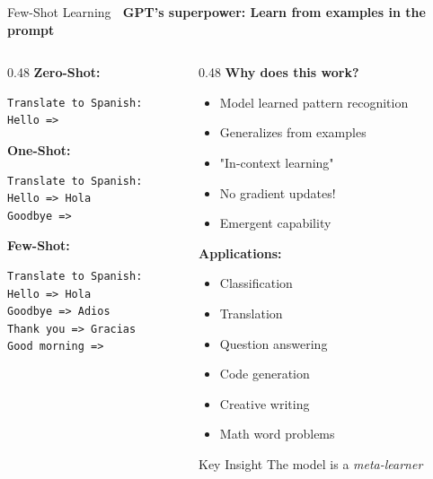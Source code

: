 \documentclass[aspectratio=169]{beamer}
\begin{document}
\begin{frame}{Few-Shot Learning 🎯}
\textbf{GPT's superpower: Learn from examples in the prompt}

\vspace{0.5em}

\begin{columns}[T]
\begin{column}{0.48\textwidth}
\textbf{Zero-Shot:}
\begin{lstlisting}[basicstyle=\ttfamily\tiny]
Translate to Spanish:
Hello =>
\end{lstlisting}

\vspace{0.3em}

\textbf{One-Shot:}
\begin{lstlisting}[basicstyle=\ttfamily\tiny]
Translate to Spanish:
Hello => Hola
Goodbye =>
\end{lstlisting}

\vspace{0.3em}

\textbf{Few-Shot:}
\begin{lstlisting}[basicstyle=\ttfamily\tiny]
Translate to Spanish:
Hello => Hola
Goodbye => Adios
Thank you => Gracias
Good morning =>
\end{lstlisting}
\end{column}

\begin{column}{0.48\textwidth}
\textbf{Why does this work?}
\begin{itemize}
    \item Model learned pattern recognition
    \item Generalizes from examples
    \item "In-context learning"
    \item No gradient updates!
    \item Emergent capability
\end{itemize}

\vspace{0.5em}

\textbf{Applications:}
\begin{itemize}
    \item Classification
    \item Translation
    \item Question answering
    \item Code generation
    \item Creative writing
    \item Math word problems
\end{itemize}

\vspace{0.3em}

\begin{alertblock}{Key Insight}
The model is a \textit{meta-learner}
\end{alertblock}
\end{column}
\end{columns}
\end{frame}
\end{document}
